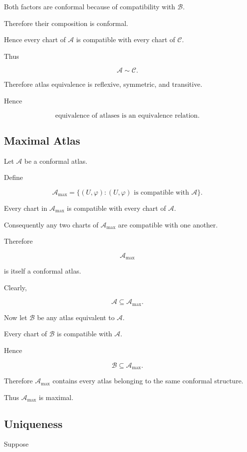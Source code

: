 \documentclass[12pt,a4paper]{article}
\theoremstyle{notespace}
\begin{document}
Both factors are conformal because of compatibility with \(\mathcal B\).

Therefore their composition is conformal.

Hence every chart of \(\mathcal A\) is compatible with every chart of \(\mathcal C\).

Thus

\[
\mathcal A\sim\mathcal C.
\]

Therefore atlas equivalence is reflexive, symmetric, and transitive.

Hence

\[
\boxed{
	\text{equivalence of atlases is an equivalence relation.}
}
\]

\subsection*{Maximal Atlas}

Let \(\mathcal A\) be a conformal atlas.

Define

\[
\mathcal A_{\max}
=
\{
(U,\varphi):
(U,\varphi)
\text{ is compatible with }
\mathcal A
\}.
\]

Every chart in \(\mathcal A_{\max}\) is compatible with every chart of \(\mathcal A\).

Consequently any two charts of \(\mathcal A_{\max}\) are compatible with one another.

Therefore

\[
\mathcal A_{\max}
\]

is itself a conformal atlas.

Clearly,

\[
\mathcal A
\subseteq
\mathcal A_{\max}.
\]

Now let \(\mathcal B\) be any atlas equivalent to \(\mathcal A\).

Every chart of \(\mathcal B\) is compatible with \(\mathcal A\).

Hence

\[
\mathcal B
\subseteq
\mathcal A_{\max}.
\]

Therefore \(\mathcal A_{\max}\) contains every atlas belonging to the same conformal structure.

Thus \(\mathcal A_{\max}\) is maximal.

\subsection*{Uniqueness}

Suppose
\end{document}

